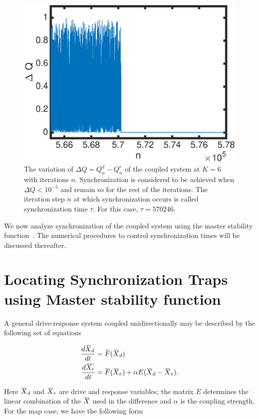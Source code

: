 \documentclass[reprint,amsmath,amssymb,aps,pre]{revtex4-1}
\newcommand{\overbar}[1]{\mkern 1.5mu\overline{\mkern-1.5mu#1\mkern-1.5mu}\mkern 1.5mu}
\begin{document}
\begin{figure}[t]
	\includegraphics[scale=.4]{Sync_exmaple}
	\caption{\label{fig:sync_ex} \footnotesize The variation of $\Delta Q = Q^d_n-Q^r_n$ of the coupled system at $K = 6$ with iterations $n$. Synchronization is considered to be achieved when $\Delta Q < 10^{-5}$ and remain so for the rest of the iterations. The iteration step $n$ at which synchronization occurs is called synchronization time $\tau$. For this case, $\tau = 570 246.$ }
\end{figure}

We now analyze synchronization of the coupled system using the master stability function~\cite{Pecora1998}. The numerical procedures to control synchronization times will be discussed thereafter.  

\section{Locating Synchronization Traps using Master stability function}
\label{Master stability function}
A general drive-response system coupled unidirectionally may be described by the following set of equations

\begin{align}
\frac{d\overbar{X}_d}{dt} & = \overbar{F}(\overbar{X}_d) \nonumber  \\
\frac{d\overbar{X_r}}{dt} &= \overbar{F}(\overbar{X}_r) + \alpha 
E(\overbar{X}_d-\overbar{X}_r).
\end{align}

\noindent Here $\overbar{X}_d$ and $\overbar{X}_r$ are drive and response 
variables; the matrix $E$ determines the linear combination of the 
$\overbar{X}$ used in the difference and $\alpha$ is the coupling strength. 
For the map case, we have the following form
\end{document}

